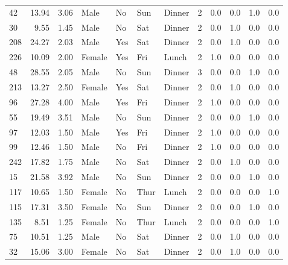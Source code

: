 \documentclass[
  letterpaper,
  DIV=11,
  numbers=noendperiod]{scrreprt}
\begin{document}
\begin{tabular}{lrrllllrrrrr}
42  &       13.94 &  3.06 &    Male &     No &   Sun &  Dinner &     2 &     0.0 &     0.0 &     1.0 &      0.0 \\
30  &        9.55 &  1.45 &    Male &     No &   Sat &  Dinner &     2 &     0.0 &     1.0 &     0.0 &      0.0 \\
208 &       24.27 &  2.03 &    Male &    Yes &   Sat &  Dinner &     2 &     0.0 &     1.0 &     0.0 &      0.0 \\
226 &       10.09 &  2.00 &  Female &    Yes &   Fri &   Lunch &     2 &     1.0 &     0.0 &     0.0 &      0.0 \\
48  &       28.55 &  2.05 &    Male &     No &   Sun &  Dinner &     3 &     0.0 &     0.0 &     1.0 &      0.0 \\
213 &       13.27 &  2.50 &  Female &    Yes &   Sat &  Dinner &     2 &     0.0 &     1.0 &     0.0 &      0.0 \\
96  &       27.28 &  4.00 &    Male &    Yes &   Fri &  Dinner &     2 &     1.0 &     0.0 &     0.0 &      0.0 \\
55  &       19.49 &  3.51 &    Male &     No &   Sun &  Dinner &     2 &     0.0 &     0.0 &     1.0 &      0.0 \\
97  &       12.03 &  1.50 &    Male &    Yes &   Fri &  Dinner &     2 &     1.0 &     0.0 &     0.0 &      0.0 \\
99  &       12.46 &  1.50 &    Male &     No &   Fri &  Dinner &     2 &     1.0 &     0.0 &     0.0 &      0.0 \\
242 &       17.82 &  1.75 &    Male &     No &   Sat &  Dinner &     2 &     0.0 &     1.0 &     0.0 &      0.0 \\
15  &       21.58 &  3.92 &    Male &     No &   Sun &  Dinner &     2 &     0.0 &     0.0 &     1.0 &      0.0 \\
117 &       10.65 &  1.50 &  Female &     No &  Thur &   Lunch &     2 &     0.0 &     0.0 &     0.0 &      1.0 \\
115 &       17.31 &  3.50 &  Female &     No &   Sun &  Dinner &     2 &     0.0 &     0.0 &     1.0 &      0.0 \\
135 &        8.51 &  1.25 &  Female &     No &  Thur &   Lunch &     2 &     0.0 &     0.0 &     0.0 &      1.0 \\
75  &       10.51 &  1.25 &    Male &     No &   Sat &  Dinner &     2 &     0.0 &     1.0 &     0.0 &      0.0 \\
32  &       15.06 &  3.00 &  Female &     No &   Sat &  Dinner &     2 &     0.0 &     1.0 &     0.0 &      0.0 \\

\end{tabular}
\end{document}
